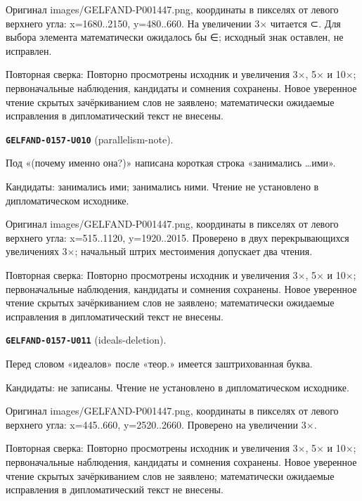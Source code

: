 Оригинал images/GELFAND-P001447.png, координаты в пикселях от левого верхнего угла: x=1680..2150, y=480..660. На увеличении 3× читается ⊂. Для выбора элемента математически ожидалось бы ∈; исходный знак оставлен, не исправлен.\par
Повторная сверка: Повторно просмотрены исходник и увеличения 3×, 5× и 10×; первоначальные наблюдения, кандидаты и сомнения сохранены. Новое уверенное чтение скрытых зачёркиванием слов не заявлено; математически ожидаемые исправления в дипломатический текст не внесены.\par\medskip
\par\noindent\leavevmode{}\label{GELFAND-0157-U010}\label{GELFAND-P001447:parallelism-note}\textbf{\texttt{GELFAND-0157-U010}} (parallelism-note).\nopagebreak[4]\par
Под «(почему именно она?)» написана короткая строка «занимались …ими».\par
Кандидаты: занимались ими; занимались ними. Чтение не установлено в дипломатическом исходнике.\par
Оригинал images/GELFAND-P001447.png, координаты в пикселях от левого верхнего угла: x=515..1120, y=1920..2015. Проверено в двух перекрывающихся увеличениях 3×; начальный штрих местоимения допускает два чтения.\par
Повторная сверка: Повторно просмотрены исходник и увеличения 3×, 5× и 10×; первоначальные наблюдения, кандидаты и сомнения сохранены. Новое уверенное чтение скрытых зачёркиванием слов не заявлено; математически ожидаемые исправления в дипломатический текст не внесены.\par\medskip
\par\noindent\leavevmode{}\label{GELFAND-0157-U011}\label{GELFAND-P001447:ideals-deletion}\textbf{\texttt{GELFAND-0157-U011}} (ideals-deletion).\nopagebreak[4]\par
Перед словом «идеалов» после «теор.» имеется заштрихованная буква.\par
Кандидаты: не записаны. Чтение не установлено в дипломатическом исходнике.\par
Оригинал images/GELFAND-P001447.png, координаты в пикселях от левого верхнего угла: x=445..660, y=2520..2660. Проверено на увеличении 3×.\par
Повторная сверка: Повторно просмотрены исходник и увеличения 3×, 5× и 10×; первоначальные наблюдения, кандидаты и сомнения сохранены. Новое уверенное чтение скрытых зачёркиванием слов не заявлено; математически ожидаемые исправления в дипломатический текст не внесены.\par\medskip

